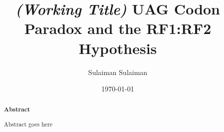 \documentclass[
    emulatestandardclasses,
    parskip=half,
]{scrartcl}
\begin{document}
    \title{\textit{(Working Title)} UAG Codon Paradox and the RF1:RF2 Hypothesis}
    \date{\today}
    \author{Sulaiman Sulaiman}
    \maketitle

    \begin{abstract}
        {\textbf{Abstract}\vspace{1em}}

        Abstract goes here
    \end{abstract}

    \pagebreak
    \pagebreak
    \pagebreak
    \pagebreak

	\newpage {}
    \nocite{anaconda,SciPy,NumPy,pandas,biopython,statsmodels,matplotlib,R,tidyverse,ggrepel,tqdm,gffutils}
	\printbibliography[notkeyword=software]
	\printbibliography[keyword=software, title={Software \& Libraries}]
	\appendix\appendixpage
\end{document}
